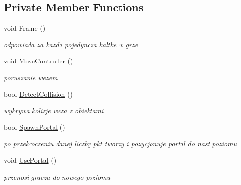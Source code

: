 \subsection*{Private Member Functions}
\begin{DoxyCompactItemize}
\item 
\mbox{\label{class_snake_ae35717522e9eefa79a99b142e3deb77d}} 
void \mbox{\hyperlink{class_snake_ae35717522e9eefa79a99b142e3deb77d}{Frame}} ()
\begin{DoxyCompactList}\small\item\em odpowiada za kazda pojedyncza kaltke w grze \end{DoxyCompactList}\item 
\mbox{\label{class_snake_abc5fc642fb22f0448384d651cea6c987}} 
void \mbox{\hyperlink{class_snake_abc5fc642fb22f0448384d651cea6c987}{Move\+Controller}} ()
\begin{DoxyCompactList}\small\item\em poruszanie wezem \end{DoxyCompactList}\item 
\mbox{\label{class_snake_a6c652aab9cfd9b5d5f153c9482783c4d}} 
bool \mbox{\hyperlink{class_snake_a6c652aab9cfd9b5d5f153c9482783c4d}{Detect\+Collision}} ()
\begin{DoxyCompactList}\small\item\em wykrywa kolizje weza z obiektami \end{DoxyCompactList}\item 
\mbox{\label{class_snake_a9af1bc16fd13597d382315adf0986626}} 
bool \mbox{\hyperlink{class_snake_a9af1bc16fd13597d382315adf0986626}{Spawn\+Portal}} ()
\begin{DoxyCompactList}\small\item\em po przekroczeniu danej liczby pkt tworzy i pozycjonuje portal do nast poziomu \end{DoxyCompactList}\item 
\mbox{\label{class_snake_ae65e64d86f8f2d40c49391f2988fb2d2}} 
void \mbox{\hyperlink{class_snake_ae65e64d86f8f2d40c49391f2988fb2d2}{Use\+Portal}} ()
\begin{DoxyCompactList}\small\item\em przenosi gracza do nowego poziomu \end{DoxyCompactList}\item 

\end{DoxyCompactItemize}
